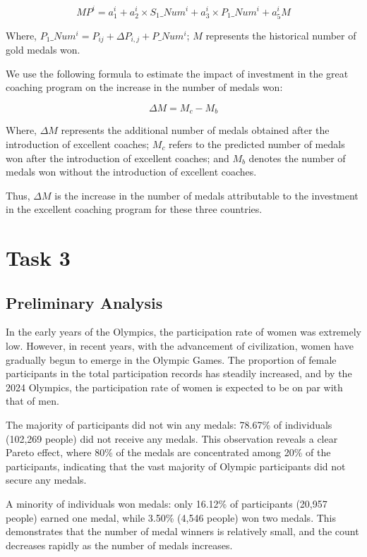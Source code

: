 \documentclass{mcmthesis}
\begin{document}
\begin{equation}
MP^{i} = a_{1} ^ {i} + a_{2} ^{i}\times S_{1}\_Num^{i} + a_{3}^{i}\times P_{1}\_Num^{i} + a_{5}^{i}M
\end{equation}

Where, $P_{1}\_Num^{i}=P_{ij} + \Delta P_{i, j} + P\_Num^{i}$; $M$ represents the historical number of gold medals won.

We use the following formula to estimate the impact of investment in the great coaching program on the increase in the number of medals won:

\begin{equation}
\Delta M=M_{c} - M_{b}
\end{equation}

Where, $\Delta M$ represents the additional number of medals obtained after the introduction of excellent coaches; $M_{c}$ refers to the predicted number of medals won after the introduction of excellent coaches; and $M_{b}$ denotes the number of medals won without the introduction of excellent coaches.

Thus, $\Delta M$ is the increase in the number of medals attributable to the investment in the excellent coaching program for these three countries.

\section{Task 3}

\subsection{Preliminary Analysis}
In the early years of the Olympics, the participation rate of women was extremely low. However, in recent years, with the advancement of civilization, women have gradually begun to emerge in the Olympic Games. The proportion of female participants in the total participation records has steadily increased, and by the 2024 Olympics, the participation rate of women is expected to be on par with that of men.

The majority of participants did not win any medals: 78.67\% of individuals (102,269 people) did not receive any medals. This observation reveals a clear Pareto effect, where 80\% of the medals are concentrated among 20\% of the participants, indicating that the vast majority of Olympic participants did not secure any medals.

A minority of individuals won medals: only 16.12\% of participants (20,957 people) earned one medal, while 3.50\% (4,546 people) won two medals. This demonstrates that the number of medal winners is relatively small, and the count decreases rapidly as the number of medals increases.
\end{document}
